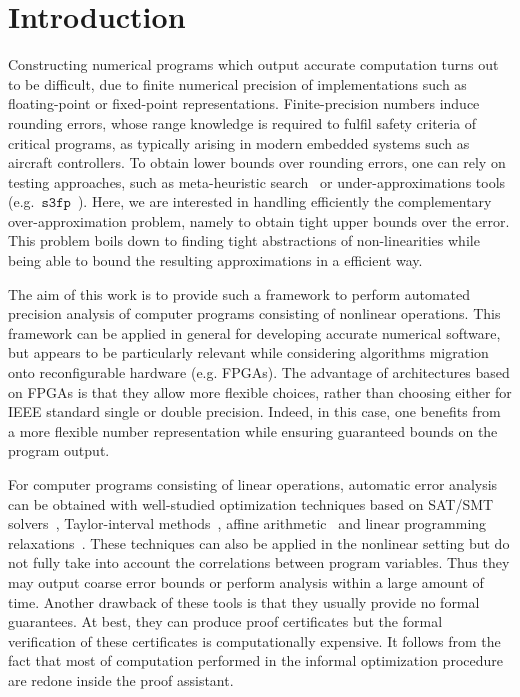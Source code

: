 \documentclass[preprint]{sigplanconf}
\newcommand{\sthreefp}{\mathtt{s3fp}}
\theoremstyle{plain}
\begin{document}
\section{Introduction} %
\label{sec:intro}
%
Constructing numerical programs which output accurate computation turns out to be difficult, due to finite numerical precision of implementations such as floating-point or fixed-point representations. Finite-precision numbers induce rounding errors, whose range knowledge is required to fulfil safety criteria of critical programs, as typically arising in modern embedded systems such as aircraft controllers.
To obtain lower bounds over rounding errors, one can rely on testing approaches, such as meta-heuristic search~\cite{Borges12Test} or under-approximations tools (e.g.~$\sthreefp$~\cite{Chiang14s3fp}). Here, we are interested in handling efficiently the complementary over-approximation problem, namely to obtain tight upper bounds over the error. This problem boils down to finding tight abstractions of non-linearities while being able to bound the resulting approximations in a efficient way.  
%


The aim of this work is to provide such a framework to perform automated precision analysis of computer programs consisting of nonlinear operations. 
This framework can be applied in general for developing accurate numerical software, but appears to be particularly relevant while considering algorithms migration onto reconfigurable hardware (e.g. FPGAs). The advantage of architectures based on FPGAs is that they allow more flexible choices, rather than choosing either for IEEE standard single or double precision. Indeed, in this case, one benefits from a more flexible number representation while ensuring guaranteed bounds on the program output. 

For computer programs consisting of linear operations, automatic error analysis can be obtained with well-studied optimization techniques based on SAT/SMT solvers~\cite{Darulova14Popl,hgbk2012fmcad}, Taylor-interval methods~\cite{fptaylor15}, affine arithmetic~\cite{fluctuat} and linear programming relaxations~\cite{Boland10HGR}.
These techniques can also be applied in the nonlinear setting but do not fully take into account the correlations between program variables. Thus they may output coarse error bounds or perform analysis within a large amount of time.  Another drawback of these tools is that they usually provide no formal guarantees. At best, they can produce proof certificates but the formal verification of these certificates is computationally expensive. It follows from the fact that most of computation performed in the informal optimization procedure are redone inside the proof assistant.
\end{document}
